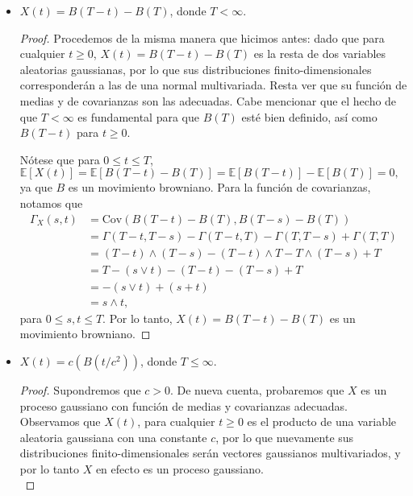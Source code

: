 \documentclass[letterpaper]{article}
\newcommand{\E}{\mathbb{E}}
\newcommand{\1}{\mathds{1}}
\theoremstyle{definition}
\theoremstyle{definition}
\theoremstyle{definition}
\theoremstyle{definition}
\theoremstyle{definition}
\begin{document}
\begin{enumerate}
\begin{itemize}
\begin{proof}
         Por lo tanto, $X$ es un proceso gaussiano con función de medias 0 y función de covarianzas
         dada por $s\wedge t$ para $s,t\geq0$, y por lo tanto, $X$ es un movimiento browniano.
         \end{proof}
        \item $X(t)=B(T-t)-B(T)$, donde $T<\infty$.
        \begin{proof} 
          Procedemos de la misma manera que hicimos antes: dado que para cualquier $t\geq0$,
          $X(t)=B(T-t)-B(T)$ es la resta de dos variables aleatorias gaussianas, por lo que
          sus distribuciones finito-dimensionales corresponderán a las de una normal 
          multivariada. Resta ver que su función de medias y de covarianzas son las adecuadas.
          Cabe mencionar que el hecho de que $T<\infty$ es fundamental para que $B(T)$ esté
          bien definido, así como $B(T-t)$ para $t\geq0$.
          \newline
 
          Nótese que para $0\leq t \leq T$, $\E\left[X(t)\right]=\E\left[B(T-t)-B(T)\right]=\E\left[B(T-t)\right]-\E\left[B(T)\right]=0,$
          ya que $B$ es un movimiento browniano. Para la función de covarianzas, notamos que
          \begin{align*}
              \Gamma_X(s,t)&=\text{Cov}\left(B(T-t)-B(T),B(T-s)-B(T)\right)\\
              &=\Gamma(T-t,T-s)-\Gamma(T-t,T)-\Gamma(T,T-s)+\Gamma(T,T)\\
              &=(T-t)\wedge(T-s)-(T-t)\wedge T-T\wedge(T-s)+T\\
              &=T-(s\vee t)-(T-t)-(T-s)+T\\
              &=-(s\vee t)+(s+t)\\
              &=s\wedge t,
          \end{align*}
          para $0\leq s,t\leq T$. Por lo tanto, $X(t)=B(T-t)-B(T)$ es un movimiento browniano.
         \end{proof}
        \item $X(t)=c(B(t/c^2))$, donde $T\leq\infty$.
        \begin{proof} 
          Supondremos que $c>0$. De nueva cuenta, probaremos que $X$ es un proceso gaussiano con función 
          de medias y covarianzas adecuadas. Observamos que $X(t)$, para cualquier $t\geq0$
          es el producto de una variable aleatoria gaussiana con una constante $c$, por lo 
          que nuevamente sus distribuciones finito-dimensionales serán vectores
          gaussianos multivariados, y por lo tanto $X$ en efecto es un proceso gaussiano.\\
          

\end{proof}
\end{itemize}
\end{enumerate}
\end{document}
